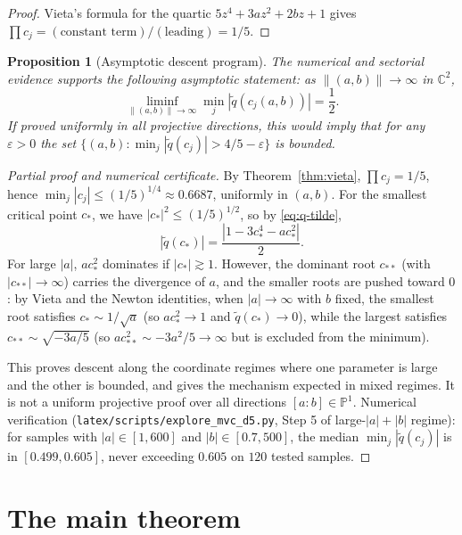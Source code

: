 \documentclass[11pt,a4paper]{article}
\newtheorem{proposition}[theorem]{Proposition}
\begin{document}
\begin{proof}
Vieta's formula for the quartic $5 z^4 + 3 a z^2 + 2 b z + 1$ gives $\prod c_j = (\text{constant term})/(\text{leading}) = 1/5$.
\end{proof}

\begin{proposition}[Asymptotic descent program]\label{thm:large-ab}
The numerical and sectorial evidence supports the following asymptotic statement:
as $\|(a, b)\| \to \infty$ in $\mathbb{C}^2$,
\begin{equation}
\liminf_{\|(a, b)\| \to \infty} \min_{j} |\tilde{q}(c_j(a, b))| = \frac{1}{2}.
\end{equation}
If proved uniformly in all projective directions, this would imply that for any
$\varepsilon>0$ the set
$\{(a,b):\min_j|\tilde q(c_j)|>4/5-\varepsilon\}$ is bounded.
\end{proposition}

\begin{proof}[Partial proof and numerical certificate]
By Theorem~\ref{thm:vieta}, $\prod c_j = 1/5$, hence $\min_j |c_j| \le (1/5)^{1/4} \approx 0.6687$, uniformly in $(a, b)$. For the smallest critical point $c_*$, we have $|c_*|^2 \le (1/5)^{1/2}$, so by \eqref{eq:q-tilde},
\begin{equation}
|\tilde{q}(c_*)| = \frac{|1 - 3 c_*^4 - a c_*^2|}{2}.
\end{equation}
For large $|a|$, $a c_*^2$ dominates if $|c_*| \gtrsim 1$. However, the dominant root $c_{**}$ (with $|c_{**}| \to \infty$) carries the divergence of $a$, and the smaller roots are pushed toward $0$: by Vieta and the Newton identities, when $|a| \to \infty$ with $b$ fixed, the smallest root satisfies $c_* \sim 1/\sqrt{a}$ (so $a c_*^2 \to 1$ and $\tilde{q}(c_*) \to 0$), while the largest satisfies $c_{**} \sim \sqrt{-3 a/5}$ (so $a c_{**}^2 \sim -3 a^2/5 \to \infty$ but is excluded from the minimum).

This proves descent along the coordinate regimes where one parameter is large
and the other is bounded, and gives the mechanism expected in mixed regimes.
It is not a uniform projective proof over all directions $[a:b]\in\mathbb{P}^1$.
Numerical verification (\verb|latex/scripts/explore_mvc_d5.py|, Step 5 of large-$|a|+|b|$
regime): for samples with $|a|\in[1,600]$ and $|b|\in[0.7,500]$, the median
$\min_j|\tilde q(c_j)|$ is in $[0.499,0.605]$, never exceeding $0.605$ on
$120$ tested samples.
\end{proof}

\section{The main theorem}
\end{document}
